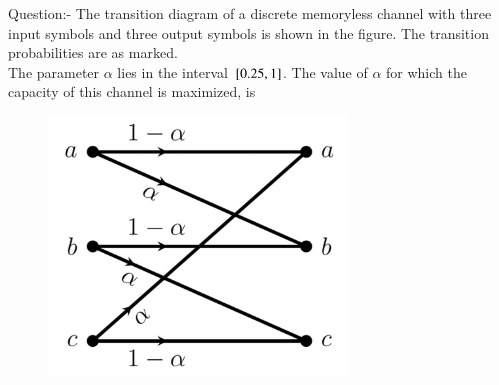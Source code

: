 \documentclass[journal,12pt,twocolumn]{IEEEtran}
\theoremstyle{remark}
\begin{document}
%
Question:-
The transition diagram of a discrete memoryless channel with three input symbols
and three output symbols is shown in the figure. The transition probabilities are as
marked.\\
The parameter $\alpha$ lies in the interval ${}\left[0.25,1\right]$. The value of $\alpha$ for which the capacity of this channel is maximized, is
\begin{figure}[!ht]
\centering
\includegraphics[width=\columnwidth/3]{./figs/figure1.png}
\label{Fig:1}
\end{figure}
\solution
\end{document}

